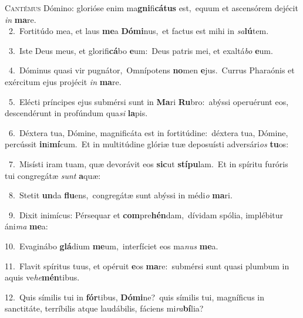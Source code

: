 \lettrine{\initial\textcolor{\initialcolor}{C}}{antémus} Dómino: glorióse enim ma\-\textbf{gni}\-fi\-\textbf{cá}\-\textbf{tus} est,~\star equum et ascensórem dejécit \textit{in} \textbf{ma}\-re.\\
{\numbfont\textcolor{\numbcolor}{~2.}}~Fortitúdo mea, et laus \textbf{me}\-a \textbf{Dó}\-\textbf{mi}nus,~\star et factus est mihi in \textit{sa}\-\textbf{lú}tem.\par
{\numbfont\textcolor{\numbcolor}{~3.}}~Iste Deus meus, et glorifi\-\textbf{cá}\-bo \textbf{e}\-um:~\star Deus patris mei, et exaltá\textit{bo} \textbf{e}\-um.\par
{\numbfont\textcolor{\numbcolor}{~4.}}~Dóminus quasi vir pugnátor,~\dagger Omnípotens \textbf{no}\-men \textbf{e}\-jus.~\star Currus Pharaónis et exércitum ejus projécit \textit{in} \textbf{ma}\-re.\par
{\numbfont\textcolor{\numbcolor}{~5.}}~Elécti príncipes ejus submérsi sunt in \textbf{Ma}\-ri \textbf{Ru}\-bro:~\star abýssi operuérunt eos, descendérunt in profúndum qua\textit{si} \textbf{la}\-pis.\par
{\numbfont\textcolor{\numbcolor}{~6.}}~Déxtera tua, Dómine, magnificáta est in fortitúdine:~\dagger déxtera tua, Dómine, percússit \textbf{in}\-i\-\textbf{mí}\-cum.~\star Et in multitúdine glóriæ tuæ deposuísti adversári\textit{os} \textbf{tu}\-os:\par
{\numbfont\textcolor{\numbcolor}{~7.}}~Misísti iram tuam, quæ devorávit eos \textbf{sic}\-ut \textbf{stí}\-\textbf{pu}lam.~\star Et in spíritu furóris tui congregátæ \textit{sunt} \textbf{a}\-quæ:\par
{\numbfont\textcolor{\numbcolor}{~8.}}~Stetit \textbf{un}\-da \textbf{flu}\-ens,~\star congregátæ sunt abýssi in médi\textit{o} \textbf{ma}\-ri.\par
{\numbfont\textcolor{\numbcolor}{~9.}}~Dixit inimícus: Pérsequar et \textbf{com}\-pre\-\textbf{hén}\-dam,~\star dívidam spólia, implébitur áni\textit{ma} \textbf{me}\-a:\par
{\numbfont\textcolor{\numbcolor}{10.}}~Evaginábo \textbf{glá}\-dium \textbf{me}\-um,~\star interfíciet eos ma\textit{nus} \textbf{me}\-a.\par
{\numbfont\textcolor{\numbcolor}{11.}}~Flavit spíritus tuus, et opéruit \textbf{e}\-os \textbf{ma}\-re:~\star submérsi sunt quasi plumbum in aquis ve\-\textit{he}\-\textbf{mén}tibus.\par
{\numbfont\textcolor{\numbcolor}{12.}}~Quis símilis tui in \textbf{fór}\-tibus, \textbf{Dó}\-\textbf{mi}ne?~\star quis símilis tui, magníficus in sanctitáte, terríbilis atque laudábilis, fáciens mi\-\textit{ra}\-\textbf{bí}lia?\par
